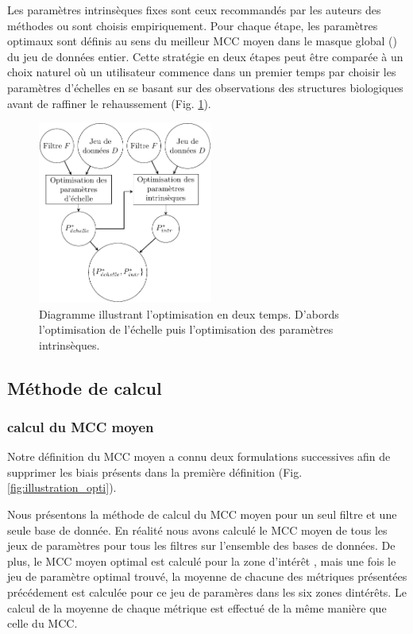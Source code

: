 Les paramètres intrinsèques fixes sont ceux recommandés par les auteurs des méthodes ou sont choisis empiriquement.  Pour chaque étape, les paramètres optimaux sont définis au sens du meilleur MCC moyen dans le masque global (\maskglobal) du jeu de données entier. Cette stratégie en deux étapes peut être comparée à un choix naturel où un utilisateur commence dans un premier temps par choisir les paramètres d'échelles en se basant sur des observations des structures biologiques avant de raffiner le rehaussement (Fig. \ref{fig:flowchart_opti}).

\begin{figure}[!ht]
  \centering
  \includegraphics[height=6cm]{Images/flowchart_benchmark.pdf}
  \caption{Diagramme illustrant l'optimisation en deux temps. D'abords l'optimisation de l'échelle puis l'optimisation des paramètres intrinsèques.}
  \label{fig:flowchart_opti}
\end{figure}


\subsection{Méthode de calcul}
\subsubsection{calcul du MCC moyen}

  Notre définition du MCC moyen a connu deux formulations successives afin de supprimer les biais présents dans la première définition (Fig. \ref{fig:illustration_opti}). 
  
  Nous présentons la méthode de calcul du MCC moyen pour un  seul filtre et une seule base de donnée. En réalité nous avons calculé le MCC moyen de tous les jeux de paramètres pour tous les filtres sur l'ensemble des bases de données. De plus, le MCC moyen optimal est calculé pour la zone d'intérêt \maskglobal, mais une fois le jeu de paramètre optimal trouvé, la moyenne de chacune des métriques présentées précédement est calculée pour ce jeu de paramères dans les six zones dintérêts. Le calcul de la moyenne de chaque métrique est effectué de la même manière que celle du MCC.

